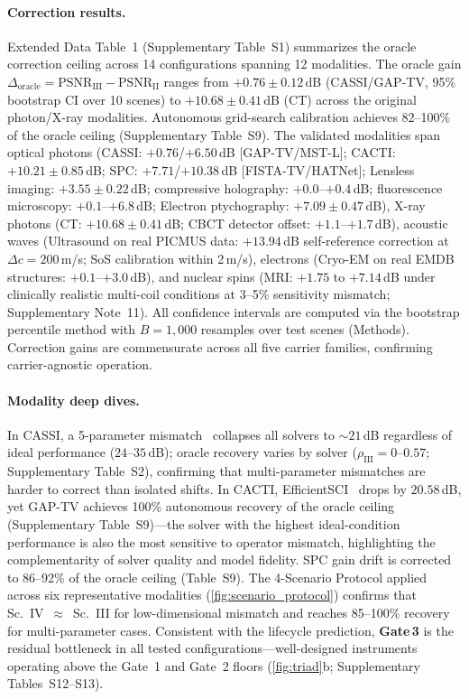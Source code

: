 \documentclass[11pt]{article}
\newcommand{\psnr}{\mathrm{PSNR}}
\newcommand{\recoveryratio}{\rho}
\newcommand{\gatethree}{\textbf{Gate\,3}}
\begin{document}
\paragraph{Correction results.}
Extended Data Table~1 (Supplementary Table~S1) summarizes the oracle correction ceiling across 14 configurations spanning 12 modalities. The oracle gain $\Delta_{\mathrm{oracle}} = \psnr_{\mathrm{III}} - \psnr_{\mathrm{II}}$ ranges from $+0.76 \pm 0.12$\,dB (CASSI/GAP-TV, 95\% bootstrap CI over 10 scenes) to $+10.68 \pm 0.41$\,dB (CT) across the original photon/X-ray modalities. Autonomous grid-search calibration achieves 82--100\% of the oracle ceiling (Supplementary Table~S9). The validated modalities span optical photons (CASSI: $+0.76$/$+6.50$\,dB [GAP-TV/MST-L]; CACTI: $+10.21 \pm 0.85$\,dB; SPC: $+7.71$/$+10.38$\,dB [FISTA-TV/HATNet]; Lensless imaging: $+3.55 \pm 0.22$\,dB; compressive holography: $+0.0$--$+0.4$\,dB; fluorescence microscopy: $+0.1$--$+6.8$\,dB; Electron ptychography: $+7.09 \pm 0.47$\,dB), X-ray photons (CT: $+10.68 \pm 0.41$\,dB; CBCT detector offset: $+1.1$--$+1.7$\,dB), acoustic waves (Ultrasound on real PICMUS data: $+13.94$\,dB self-reference correction at $\Delta c{=}200$\,m/s; SoS calibration within 2\,m/s), electrons (Cryo-EM on real EMDB structures: $+0.1$--$+3.0$\,dB), and nuclear spins (MRI: $+1.75$ to $+7.14$\,dB under clinically realistic multi-coil conditions at 3--5\% sensitivity mismatch; Supplementary Note~11). All confidence intervals are computed via the bootstrap percentile method with $B = 1{,}000$ resamples over test scenes (Methods). Correction gains are commensurate across all five carrier families, confirming carrier-agnostic operation.

\paragraph{Modality deep dives.}
In CASSI, a 5-parameter mismatch~\cite{yang2026inversenet} collapses all solvers to ${\sim}21$\,dB regardless of ideal performance ($24$--$35$\,dB); oracle recovery varies by solver ($\recoveryratio_{\mathrm{III}} = 0$--$0.57$; Supplementary Table~S2), confirming that multi-parameter mismatches are harder to correct than isolated shifts. In CACTI, EfficientSCI~\cite{wang2023efficientsci} drops by $20.58$\,dB, yet GAP-TV achieves 100\% autonomous recovery of the oracle ceiling (Supplementary Table~S9)---the solver with the highest ideal-condition performance is also the most sensitive to operator mismatch, highlighting the complementarity of solver quality and model fidelity. SPC gain drift is corrected to 86--92\% of the oracle ceiling (Table~S9). The 4-Scenario Protocol applied across six representative modalities (\cref{fig:scenario_protocol}) confirms that Sc.~IV~$\approx$~Sc.~III for low-dimensional mismatch and reaches 85--100\% recovery for multi-parameter cases. Consistent with the lifecycle prediction, \gatethree{} is the residual bottleneck in all tested configurations---well-designed instruments operating above the Gate~1 and Gate~2 floors (\cref{fig:triad}b; Supplementary Tables~S12--S13).
\end{document}
